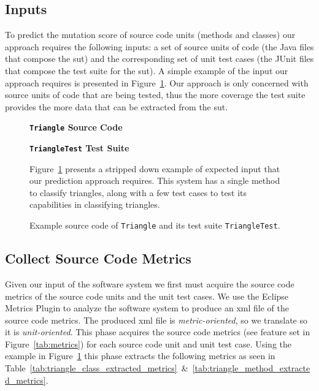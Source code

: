 \subsection{Inputs}
\label{subsec:appraoch_inputs}
To predict the mutation score of source code units (methods and classes) our approach requires the following inputs: a set of source units of code (the Java files that compose the \gls{sut}) and the corresponding set of unit test cases (the JUnit files that compose the test suite for the \gls{sut}). A simple example of the input our approach requires is presented in Figure~\ref{fig:triangle_example}. Our approach is only concerned with source units of code that are being tested, thus the more coverage the test suite provides the more data that can be extracted from the \gls{sut}.

\begin{figure}[h]
  \centering
  \begin{minipage}{6.75cm}
  \centering
  \footnotesize{\textbf{\texttt{Triangle} Source Code}}
  
  \end{minipage}
  \qquad
  \begin{minipage}{6.75cm}
  \centering
  \footnotesize{\textbf{\texttt{TriangleTest} Test Suite}}
  
  \end{minipage}
  \caption{Example source code of \texttt{Triangle} and its test suite \texttt{TriangleTest}.}
  \vspace{1mm}
  \footnotesize{Figure~\ref{fig:triangle_example} presents a stripped down example of expected input that our prediction approach requires. This system has a single method to classify triangles, along with a few test cases to test its capabilities in classifying triangles.}
  \vspace{1mm}
  \label{fig:triangle_example}
\end{figure}


\subsection{Collect Source Code Metrics}
\label{subsec:appraoch_collect_source_metrics}
Given our input of the software system we first must acquire the source code metrics of the source code units and the unit test cases. We use the Eclipse Metrics Plugin to analyze the software system to produce an \gls{xml} file of the source code metrics. The produced \gls{xml} file is \emph{metric-oriented}, so we translate so it is \emph{unit-oriented}. This phase acquires the source code metrics (see feature set  in Figure~\ref{tab:metrics}) for each source code unit and unit test case. Using the example in Figure~\ref{fig:triangle_example} this phase extracts the following metrics as seen in Table~\ref{tab:triangle_class_extracted_metrics}~\&~\ref{tab:triangle_method_extracted_metrics}.

